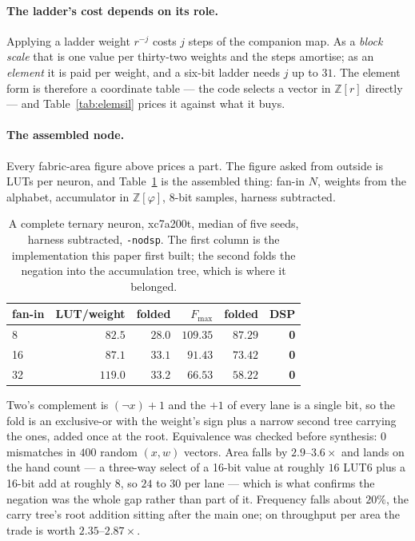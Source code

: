 \paragraph{The ladder's cost depends on its role.} Applying a ladder weight
$r^{-j}$ costs $j$ steps of the companion map. As a \emph{block scale} that is
one value per thirty-two weights and the steps amortise; as an \emph{element} it
is paid per weight, and a six-bit ladder needs $j$ up to $31$. The element form
is therefore a coordinate table --- the code selects a vector in
$\mathbb{Z}[r]$ directly --- and Table~\ref{tab:elemsil} prices it against what
it buys.

\paragraph{The assembled node.} Every fabric-area figure above prices a part. The
figure asked from outside is LUTs per neuron, and Table~\ref{tab:node} is the
assembled thing: fan-in $N$, weights from the alphabet, accumulator in
$\mathbb{Z}[\varphi]$, 8-bit samples, harness subtracted.

\begin{table}[t]\centering
\caption{A complete ternary neuron, xc7a200t, median of five seeds, harness
subtracted, \texttt{-nodsp}. The first column is the implementation this paper
first built; the second folds the negation into the accumulation tree, which is
where it belonged.}
\label{tab:node}
\begin{tabular}{lrrrrr}
\toprule
fan-in & LUT/weight & folded & $F_{\max}$ & folded & DSP \\
\midrule
8  & $82.5$ & $\mathbf{28.0}$ & $109.35$ & $87.29$ & \textbf{0} \\
16 & $87.1$ & $\mathbf{33.1}$ & $91.43$ & $73.42$ & \textbf{0} \\
32 & $119.0$ & $\mathbf{33.2}$ & $66.53$ & $58.22$ & \textbf{0} \\
\bottomrule
\end{tabular}
\end{table}

Two's complement is $(\lnot x)+1$ and the $+1$ of every lane is a single bit, so
the fold is an exclusive-or with the weight's sign plus a narrow second tree
carrying the ones, added once at the root. Equivalence was checked before
synthesis: $0$ mismatches in $400$ random $(x,w)$ vectors. Area falls by
$2.9$--$3.6\times$ and lands on the hand count --- a three-way select of a
16-bit value at roughly $16$ LUT6 plus a 16-bit add at roughly $8$, so $24$ to
$30$ per lane --- which is what confirms the negation was the whole gap rather
than part of it. Frequency falls about $20\%$, the carry tree's root addition
sitting after the main one; on throughput per area the trade is worth
$2.35$--$2.87\times$.

